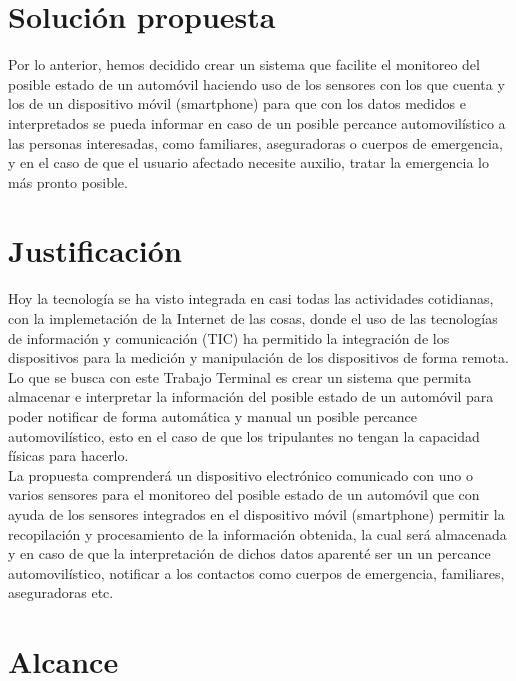\section{Solución propuesta}

Por lo anterior, hemos decidido crear un sistema que facilite el monitoreo del posible estado de un automóvil haciendo uso de los sensores con los que cuenta y los de un dispositivo móvil (smartphone) para que con los datos medidos e interpretados se pueda informar en caso de un posible percance automovilístico a las personas interesadas, como familiares, aseguradoras o cuerpos de emergencia, y en el caso de que el usuario afectado necesite auxilio, tratar la emergencia lo más pronto posible.



\section{Justificación}
Hoy la tecnología se ha visto integrada en casi todas las actividades cotidianas, con la implemetación de la Internet de las cosas, donde el uso de las tecnologías de información y comunicación (TIC) ha permitido la integración de los dispositivos para la medición y manipulación de los dispositivos de forma remota.\\



Lo que se busca con este Trabajo Terminal es crear un sistema que permita almacenar e interpretar la información del posible estado de un automóvil para poder notificar de forma automática y manual un posible percance automovilístico, esto en el caso de que los tripulantes no tengan la capacidad físicas para hacerlo.\\


La propuesta comprenderá un dispositivo electrónico comunicado con uno o varios sensores para el monitoreo del posible estado de un automóvil que con ayuda de los sensores integrados en el dispositivo móvil (smartphone) permitir la recopilación y procesamiento de la información obtenida, la cual será almacenada y en caso de que la interpretación de dichos datos aparenté ser un un percance automovilístico, notificar a los contactos como cuerpos de emergencia, familiares, aseguradoras etc.



\section{Alcance}


